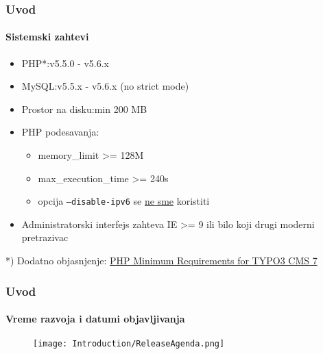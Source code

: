 
\begin{frame}[fragile]
	\frametitle{Uvod}
	\framesubtitle{Sistemski zahtevi}

	\begin{itemize}
		\item PHP*:\tabto{3.5cm}v5.5.0 - v5.6.x
		\item MySQL:\tabto{3.5cm}v5.5.x - v5.6.x (no strict mode)
		\item Prostor na disku:\tabto{3.5cm}min 200 MB
		\item PHP podesavanja:

			\begin{itemize}
				\item memory\_limit >= 128M
				\item max\_execution\_time >= 240s
				\item opcija \texttt{--disable-ipv6} se \underline{ne sme} koristiti
			\end{itemize}

		\item Administratorski interfejs zahteva IE >= 9 ili bilo koji drugi moderni pretrazivac

	\end{itemize}

	\vspace{0.5cm}
	*) Dodatno objasnjenje: \href{http://typo3.org/news/article/php-minimum-requirements-for-typo3-cms-7/}{PHP Minimum Requirements for TYPO3 CMS 7}

\end{frame}


\begin{frame}[fragile]
	\frametitle{Uvod}
	\framesubtitle{Vreme razvoja i datumi objavljivanja}

	\begin{figure}
		\texttt{[image: Introduction/ReleaseAgenda.png]}
	\end{figure}

\end{frame}

